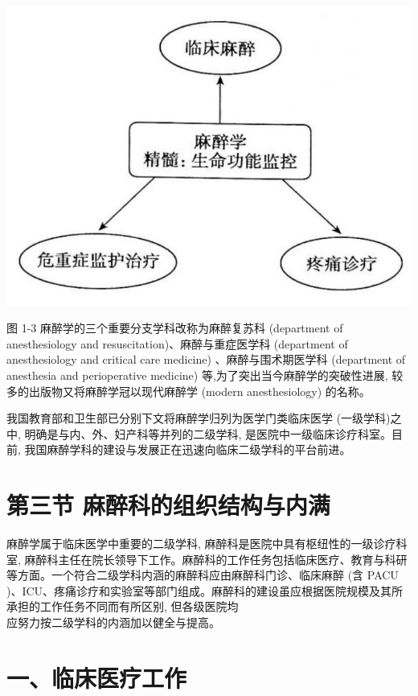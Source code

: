 \documentclass[10pt]{article}
\begin{document}
\begin{center}
\includegraphics[max width=\textwidth]{2024_07_09_002a177993bd97d1d6d7g-028}
\end{center}

图 1-3 麻醉学的三个重要分支学科改称为麻醉复苏科 (department of anesthesiology and resuscitation)、麻醉与重症医学科 (department of anesthesiology and critical care medicine) 、麻醉与围术期医学科 (department of anesthesia and perioperative medicine) 等,为了突出当今麻醉学的突破性进展, 较多的出版物又将麻醉学冠以现代麻醉学 (modern anesthesiology) 的名称。

我国教育部和卫生部已分别下文将麻醉学归列为医学门类临床医学 (一级学科)之中, 明确是与内、外、妇产科等并列的二级学科, 是医院中一级临床诊疗科室。目前, 我国麻醉学科的建设与发展正在迅速向临床二级学科的平台前进。

\section*{第三节 麻醉科的组织结构与内满}
麻醉学属于临床医学中重要的二级学科, 麻醉科是医院中具有枢纽性的一级诊疗科室, 麻醉科主任在院长领导下工作。麻醉科的工作任务包括临床医疗、教育与科研等方面。一个符合二级学科内涵的麻醉科应由麻醉科门诊、临床麻醉 (含 PACU )、ICU、疼痛诊疗和实验室等部门组成。麻醉科的建设虽应根据医院规模及其所承担的工作任务不同而有所区别, 但各级医院均\\
应努力按二级学科的内涵加以健全与提高。

\section*{一、临床医疗工作}
\end{document}
